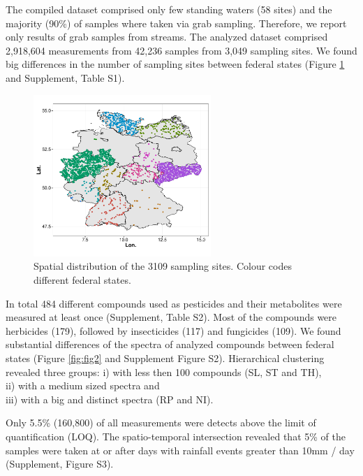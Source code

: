 \documentclass[journal=esthag,manuscript=article]{achemso}
\begin{document}
The compiled dataset comprised only few standing waters (58 sites) and the majority (90\%) of samples where taken via grab sampling.  %
Therefore, we report only results of grab samples from streams. 
The analyzed dataset comprised 2,918,604 measurements from 42,236 samples from 3,049 sampling sites.  %
We found big differences in the number of sampling sites between federal states (Figure \ref{fig:fig1} and Supplement, Table S1).

\begin{figure}[ht]
  \includegraphics[width=0.6\textwidth]{figure1.pdf}
  \caption{Spatial distribution of the 3109 sampling sites. Colour codes different federal states.}
  \label{fig:fig1}
\end{figure}

In total 484 different compounds used as pesticides and their metabolites were measured at least once (Supplement, Table S2). 
Most of the compounds were herbicides (179), followed by insecticides (117) and fungicides (109).
We found substantial differences of the spectra of analyzed compounds between federal states (Figure \ref{fig:fig2} and Supplement Figure S2).
Hierarchical clustering revealed three groups:
i) with less then 100 compounds (SL, ST and TH), \\
ii) with a medium sized spectra and \\
iii) with a big and distinct spectra (RP and NI).

Only 5.5\% (160,800) of all measurements were detects above the limit of quantification (LOQ).
The spatio-temporal intersection revealed that 5\% of the samples were taken at or after days with rainfall events greater than 10mm / day (Supplement, Figure S3).
\end{document}
